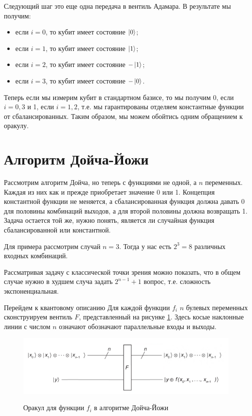 \documentclass[a4paper, 12pt]{article}
\begin{document}
Следующий шаг это еще одна передача в вентиль Адамара. В результате мы получим:

\begin{itemize}
	\item если $i = 0$, то кубит имеет состояние $\ket{0}$;
	
	\item если $i = 1$, то кубит имеет состояние $\ket{1}$;
	
	\item если $i = 2$, то кубит имеет состояние $-\ket{1}$;
	
	\item если $i = 3$, то кубит имеет состояние $-\ket{0}$.
\end{itemize}

Теперь если мы измерим кубит в стандартном базисе, то мы получим 0, если $i = 0, 3$ и 1, если $i=1, 2$, т.е. мы гарантированы отделяем константные функции от сбалансированных. Таким образом, мы можем обойтись одним обращением к оракулу.

\section{Алгоритм Дойча-Йожи}

Рассмотрим алгоритм Дойча, но теперь с функциями не одной, а $n$ переменных. Каждая из них как и прежде приобретает значение 0 или 1. Концепция константной функции не меняется, а сбалансированная функция должна давать 0 для половины комбинаций выходов, а для второй половины должна возвращать 1. Задача остается той же, нужно понять, является ли случайная функция сбалансированной или константной.

Для примера рассмотрим случай $n=3$. Тогда у нас есть $2^3 = 8$ различных входных комбинаций.

Рассматривая задачу с классической точки зрения можно показать, что в общем случае нужно в худшем случа задать $2^{n-1} + 1$ вопрос, т.е. сложность экспоненциальная.

Перейдем к квантовому описанию Для каждой функции $f_i$ $n$ булевых переменных сконструируем вентиль $F$, представленный на рисунке \ref{Doice-JozheF}. Здесь косые наклонные линии с числом $n$ означают обозначают параллельные входы и выходы.

\begin{figure}[H]
	\centering
	\includegraphics[width=0.8\linewidth]{Doice-JozheF}
	\label{Doice-JozheF}
	\caption{Оракул для функции $f_i$ в алгоритме Дойча-Йожи}
\end{figure}
\end{document}
